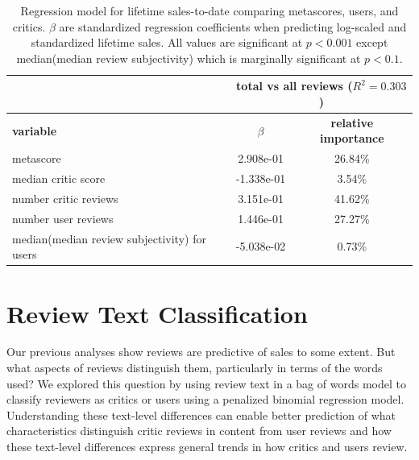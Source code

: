 \documentclass[letterpaper]{article}
\begin{document}
\begin{table}[tb]
\centering
\scriptsize
\begin{tabularx}{\linewidth}{|X|c|c|}
\hline  & \multicolumn{2}{|c|}{\textbf{total vs all reviews} ($R^2 = 0.303$)}\\ 
\hline \textbf{variable} & \textbf{$\beta$} & \textbf{relative importance}\\ 
\hline metascore & 2.908e-01 & 26.84\%\\ 
\hline median critic score & -1.338e-01 & 3.54\%\\ 
\hline number critic reviews & 3.151e-01 & 41.62\%\\ 
\hline number user reviews & 1.446e-01 & 27.27\%\\ 
\hline median(median review subjectivity) for users & -5.038e-02 & 0.73\%\\ 
\hline 
\end{tabularx}
\caption{Regression model for lifetime sales-to-date comparing metascores, users, and critics. $\beta$ are standardized regression coefficients when predicting log-scaled and standardized lifetime sales. All values are significant at $p < 0.001$ except median(median review subjectivity) which is marginally significant at $p < 0.1$.}
\label{tab:sales_metascore_lm}
\end{table}




\section{Review Text Classification}
Our previous analyses show reviews are predictive of sales to some extent. But what aspects of reviews distinguish them, particularly in terms of the words used? We explored this question by using review text in a bag of words model to classify reviewers as critics or users using a penalized binomial regression model. Understanding these text-level differences can enable better prediction of what characteristics distinguish critic reviews in content from user reviews and how these text-level differences express general trends in how critics and users review. 
\end{document}
